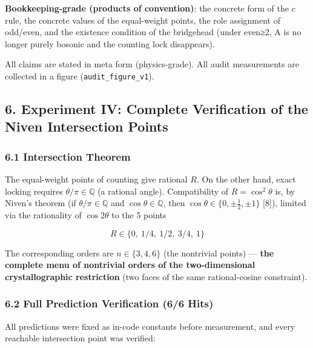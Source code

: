 \documentclass[
  a4paper,
]{article}
\begin{document}
\textbf{Bookkeeping-grade (products of convention)}: the concrete form
of the \(c\) rule, the concrete values of the equal-weight points, the
role assignment of odd/even, and the existence condition of the
bridgehead (under even≥2, A is no longer purely bosonic and the counting
lock disappears).

All claims are stated in meta form (physics-grade). All audit
measurements are collected in a figure (\texttt{audit\_figure\_v1}).

\subsection{6. Experiment IV: Complete Verification of the Niven
Intersection
Points}\label{experiment-iv-complete-verification-of-the-niven-intersection-points}

\subsubsection{6.1 Intersection Theorem}\label{intersection-theorem}

The equal-weight points of counting give rational \(R\). On the other
hand, exact locking requires \(\theta/\pi\in\mathbb{Q}\) (a rational
angle). Compatibility of \(R=\cos^2\theta\) is, by Niven's theorem (if
\(\theta/\pi\in\mathbb{Q}\) and \(\cos\theta\in\mathbb{Q}\), then
\(\cos\theta\in\{0,\pm\tfrac12,\pm1\}\) {[}8{]}), limited via the
rationality of \(\cos2\theta\) to the 5 points

\[
R\in\{0,\ 1/4,\ 1/2,\ 3/4,\ 1\}
\]

The corresponding orders are \(n\in\{3,4,6\}\) (the nontrivial points)
--- \textbf{the complete menu of nontrivial orders of the
two-dimensional crystallographic restriction} (two faces of the same
rational-cosine constraint).

\subsubsection{6.2 Full Prediction Verification (6/6
Hits)}\label{full-prediction-verification-66-hits}

All predictions were fixed as in-code constants before measurement, and
every reachable intersection point was verified:
\end{document}
